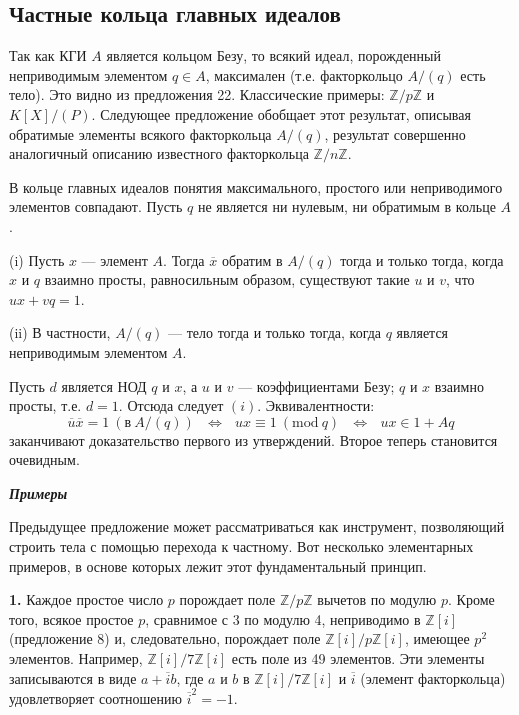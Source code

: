 \subsection{Частные кольца главных идеалов}
Так как КГИ $A$ является кольцом Безу, то всякий идеал,  
порожденный неприводимым элементом $q \in A$, максимален (т.е. факторкольцо 
$A\slash(q)$ есть тело). Это видно из предложения 22. Классические примеры: 
$\mathbb{Z}\slash p\mathbb{Z}$ и $K[X]\slash(P)$. Следующее предложение обобщает этот результат, 
описывая обратимые элементы всякого факторкольца $A\slash(q)$, результат 
совершенно аналогичный описанию известного факторкольца $\mathbb{Z}\slash n\mathbb{Z}$. 
\begin{predl}

\hspace*{15pt}В кольце главных идеалов понятия максимального, простого или 
неприводимого элементов совпадают. Пусть $q$ не является ни нулевым, 
ни обратимым в кольце $A$. 

(i) Пусть $x$ — элемент $A$. Тогда $\overline{x}$ обратим в $A\slash(q)$ тогда и только 
тогда, когда $x$ и $q$ взаимно просты, равносильным образом, существуют 
такие $u$ и $v$, что $ux + vq = 1$. 

(ii) В частности, $A\slash(q)$ — тело тогда и только тогда, когда $q$  
является неприводимым элементом $A$. 
\end{predl}
\begin{myproof}
Пусть $d$ является НОД $q$ и $x$, а $u$ и $v$ — коэффициентами Безу; $q$ и $x$ 
взаимно просты, т.е. $d = 1$. Отсюда следует $(i)$. Эквивалентности: 
\begin{equation*}
\overline{u}\overline{x} = 1\: (\text{в}\: A\slash (q))\:\:\: \Leftrightarrow\:\:\: ux \equiv 1\: (\text{mod}\:q)\:\:\: \Leftrightarrow \:\:\: ux \in 1 + Aq
\end{equation*}
заканчивают доказательство первого из утверждений. Второе теперь
 становится очевидным. 
\end{myproof}

\noindent\textbf{\textit{Примеры}}

Предыдущее предложение может рассматриваться как инструмент, 
позволяющий строить тела с помощью перехода к частному. Вот  
несколько элементарных примеров, в основе которых лежит этот  
фундаментальный принцип. 
\pagebreak

\textbf{1.} Каждое простое число $p$ порождает поле $\mathbb{Z}\slash p\mathbb{Z}$ вычетов по  
модулю $p$. Кроме того, всякое простое $p$, сравнимое с 3 по модулю 4, 
неприводимо в $\mathbb{Z}[i]$ (предложение 8) и, следовательно, порождает поле 
$\mathbb{Z}[i]\slash p\mathbb{Z}[i]$, имеющее $p^2$ элементов. Например, $\mathbb{Z}[i]\slash 7\mathbb{Z}[i]$ есть поле из 49 
элементов. Эти элементы записываются в виде $a+\overline{i}b$, где $a$ и $b$ в $\mathbb{Z}[i]\slash 7\mathbb{Z}[i]$
и $\overline{i}$ (элемент факторкольца) удовлетворяет соотношению $\overline{i}^2 = - 1.$

